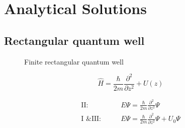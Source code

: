\section{Analytical Solutions}
	\subsection{Rectangular quantum well}
		\begin{figure}[!h]
			\centering
			
			\caption{Finite rectangular quantum well}
		\end{figure}
		
		\begin{equation}
			\hat{H} = \frac{\hbar}{2m} \frac{\partial^2}{\partial z^2} + U(z)
		\end{equation}
		
		\begin{align}
			\text{II:}&\qquad E\Psi = \frac{\hbar}{2m} \frac{\partial^2}{\partial z^2}\Psi \\
			\text{I \& III:}& \qquad E\Psi = \frac{\hbar}{2m} \frac{\partial^2}{\partial z^2}\Psi + U_0\Psi 
		\end{align}
				
